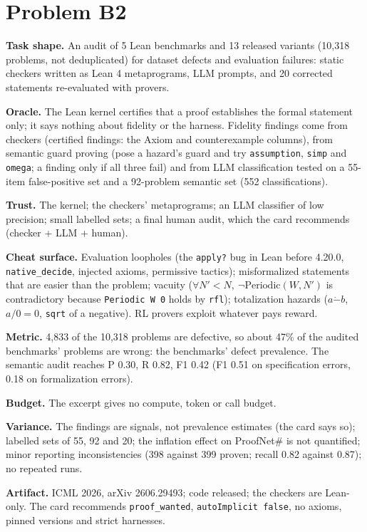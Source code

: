 \documentclass[11pt]{article}
\begin{document}
\section*{Problem B2}\label{ans:B2}
\begin{answer}
\textbf{Task shape.} An audit of 5 Lean benchmarks and 13 released variants
(10,318 problems, not deduplicated) for dataset defects and evaluation
failures: static checkers written as Lean 4 metaprograms, LLM prompts, and 20
corrected statements re-evaluated with provers.

\textbf{Oracle.} The Lean kernel certifies that a proof establishes the formal
statement only; it says nothing about fidelity or the harness. Fidelity
findings come from checkers (certified findings: the Axiom and counterexample
columns), from semantic guard proving (pose a hazard's guard and try
\texttt{assumption}, \texttt{simp} and \texttt{omega}; a finding only if all
three fail) and from LLM classification tested on a 55-item false-positive set
and a 92-problem semantic set (552 classifications).

\textbf{Trust.} The kernel; the checkers' metaprograms; an LLM classifier of
low precision; small labelled sets; a final human audit, which the card
recommends (checker + LLM + human).

\textbf{Cheat surface.} Evaluation loopholes (the \texttt{apply?} bug in Lean
before 4.20.0, \texttt{native\_decide}, injected axioms, permissive tactics);
misformalized statements that are easier than the problem; vacuity
($\forall N'<N,\ \neg\mathrm{Periodic}(W,N')$ is contradictory because
\texttt{Periodic W 0} holds by \texttt{rfl}); totalization hazards
($a\mathbin{\dot-}b$, $a/0=0$, \texttt{sqrt} of a negative). RL provers exploit
whatever pays reward.

\textbf{Metric.} 4,833 of the 10,318 problems are defective, so about 47\% of
the audited benchmarks' problems are wrong: the benchmarks' defect prevalence.
The semantic audit reaches P 0.30, R 0.82, F1 0.42 (F1 0.51 on specification
errors, 0.18 on formalization errors).

\textbf{Budget.} The excerpt gives no compute, token or call budget.

\textbf{Variance.} The findings are signals, not prevalence estimates
(the card says so); labelled sets of 55, 92 and 20; the inflation effect on
ProofNet\# is not quantified; minor reporting inconsistencies (398 against 399
proven; recall 0.82 against 0.87); no repeated runs.

\textbf{Artifact.} ICML 2026, arXiv 2606.29493; code released; the checkers are
Lean-only. The card recommends \texttt{proof\_wanted}, \texttt{autoImplicit
false}, no axioms, pinned versions and strict harnesses.


\end{answer}
\end{document}

